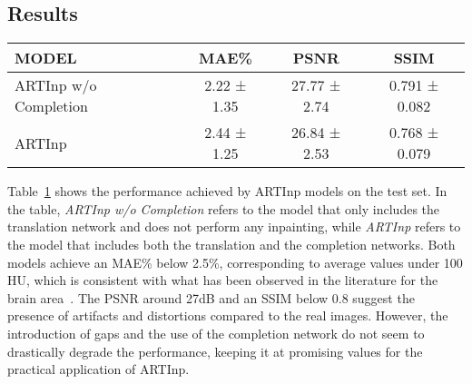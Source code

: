 \subsection{Results}
\begin{table}
	\centering
	\begin{tabular}{lccc}
	MODEL                  & MAE\%         & PSNR           & SSIM            \\ \hline
	
	ARTInp w/o Completion         & 2.22   ± 1.35 & 27.77   ± 2.74 & 0.791   ± 0.082 \\
	ARTInp & 2.44   ± 1.25 & 26.84   ± 2.53 & 0.768   ± 0.079
	\end{tabular}
	\label{tab:set1_results}
	\end{table}	
Table~\ref{tab:set1_results} shows the performance achieved by ARTInp models on the test set.
In the table, \emph{ARTInp w/o Completion} refers to the model that only includes the translation network and does not perform any inpainting, while \emph{ARTInp} refers to the model that includes both the translation and the completion networks.
Both models achieve an MAE\% below 2.5\%, corresponding to average values under 100 HU, which is consistent with what has been observed in the literature for the brain area~\cite{edmund_review_2017}.
The PSNR around 27dB and an SSIM below 0.8 suggest the presence of artifacts and distortions compared to the real images. 
However, the introduction of gaps and the use of the completion network do not seem to drastically degrade the performance, keeping it at promising values for the practical application of ARTInp.

